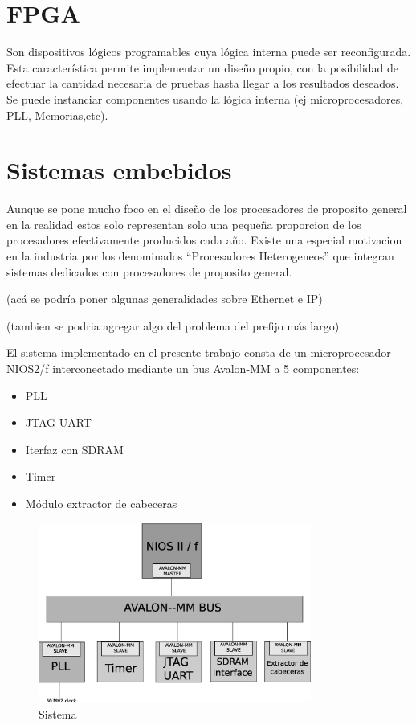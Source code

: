 \section{FPGA}
Son dispositivos lógicos programables cuya lógica interna puede ser reconfigurada. Esta característica permite implementar un diseño propio, con la posibilidad de efectuar la cantidad necesaria de pruebas hasta llegar a los resultados deseados. Se puede instanciar componentes usando la lógica interna (ej microprocesadores, PLL, Memorias,etc).

\section{Sistemas embebidos}
Aunque se pone mucho foco en el  diseño de los procesadores de proposito general en la realidad estos solo representan solo una pequeña proporcion de los procesadores efectivamente producidos cada año.  Existe una especial motivacion en la industria por los denominados “Procesadores Heterogeneos” que integran sistemas dedicados con procesadores de proposito general.

(acá se podría poner algunas generalidades sobre Ethernet e IP)

(tambien se podria agregar algo del problema del prefijo más largo)


El sistema implementado en el presente trabajo consta de un microprocesador NIOS2/f interconectado mediante un bus Avalon-MM a 5 componentes: 
\begin{itemize}
\item PLL
\item JTAG UART
\item Iterfaz con SDRAM
\item Timer
\item Módulo extractor de cabeceras
\end{itemize}


\begin{figure}[h]
  \centering
	\includegraphics[width=0.80\textwidth]{2-sistema/graf/sistema.eps}
  \caption{Sistema}
  \label{fig}
\end{figure}

